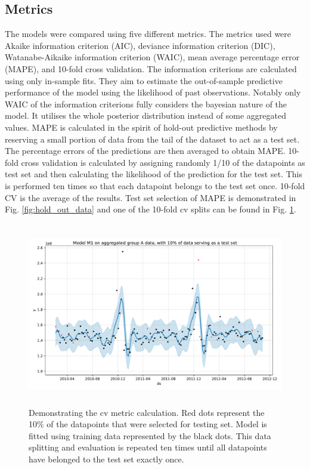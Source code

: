 \documentclass[english, 12pt, a4paper, sci, utf8, a-1b, online]{aaltothesis}
\begin{document}


\subsection{Metrics}

The models were compared using five different metrics. The metrics used were Akaike information criterion (AIC), deviance information criterion (DIC), Watanabe-Aikaike information criterion (WAIC), mean average percentage error (MAPE), and 10-fold cross validation. The information criterions are calculated using only in-sample fits. They aim to estimate the out-of-sample predictive performance of the model using the likelihood of past observations. Notably only WAIC of the information criterions fully considers the bayesian nature of the model. It utilises the whole posterior distribution instead of some aggregated values. MAPE is calculated in the spirit of hold-out predictive methods by reserving a small portion of data from the tail of the dataset to act as a test set. The percentage errors of the predictions are then averaged to obtain MAPE. 10-fold cross validation is calculated by assigning randomly 1/10 of the datapoints as test set and then calculating the likelihood of the prediction for the test set. This is performed ten times so that each datapoint belongs to the test set once. 10-fold CV is the average of the results. Test set selection of MAPE is demonstrated in Fig. \ref{fig:hold_out_data} and one of the 10-fold cv splits can be found in Fig. \ref{fig:cv_demo}. 

\begin{figure}[htb]
	\centering
	\includegraphics[height=8cm]{../plots/forecasts/cv_metric_demo_plot.pdf}
	\caption{Demonstrating the cv metric calculation. Red dots represent the 10\% of the datapoints that were selected for testing set. Model is fitted using training data represented
	by the black dots. This data splitting and evaluation is repeated ten times until all datapoints have belonged to the test set exactly once.}
	\label{fig:cv_demo}
\end{figure}
\end{document}
